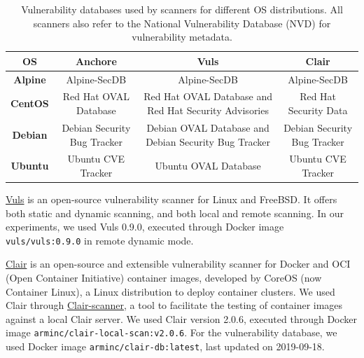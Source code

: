 \documentclass[a4paper,num-refs]{oup-contemporary}
\newcommand{\revision}[1]{\color{ao(english)}#1\color{black}\xspace}
\begin{document}
\begin{table}
\begin{tabular}{|c|c|c|c|}
 \hline
\textbf{OS} &	\textbf{Anchore} &	\textbf{Vuls} &	\textbf{Clair} \\
\hline
	\textbf{Alpine} & Alpine-SecDB &	Alpine-SecDB &	Alpine-SecDB \\
\hline
	\textbf{CentOS} & Red Hat OVAL Database & Red Hat OVAL Database and Red Hat Security Advisories & Red Hat Security Data \\
\hline
	\textbf{Debian} & Debian Security Bug Tracker &	Debian OVAL Database and Debian Security Bug Tracker & Debian Security Bug Tracker \\
\hline
	\textbf{Ubuntu} & Ubuntu CVE Tracker &	Ubuntu OVAL Database &	Ubuntu CVE Tracker \\
 \hline
\end{tabular}
\caption{Vulnerability databases used by scanners for different OS distributions. All scanners also refer to 
the National Vulnerability Database (NVD) for vulnerability metadata.}
\label{table:databases}
\end{table}

\href{https://github.com/future-architect/vuls}{Vuls} is an open-source vulnerability scanner for Linux and FreeBSD. It
offers both static and dynamic scanning, and both local and remote
scanning. In our experiments, we used Vuls 0.9.0, executed through Docker image
\texttt{vuls/vuls:0.9.0} in remote dynamic mode.

\href{https://github.com/quay/clair}{Clair} is an open-source and
extensible vulnerability scanner for Docker and \revision{OCI (Open Container Initiative)} container images,
developed by CoreOS (now Container Linux), a Linux distribution to deploy
container clusters.
 We used Clair through
\href{https://github.com/arminc/clair-scanner}{Clair-scanner}, a tool to
facilitate the testing of container images against a local Clair server. 
We used Clair version 2.0.6, executed through
Docker image \texttt{arminc/clair-local-scan:v2.0.6}. For the vulnerability
database, we used Docker image \texttt{arminc/clair-db:latest}, last
updated on 2019-09-18.
\end{document}
